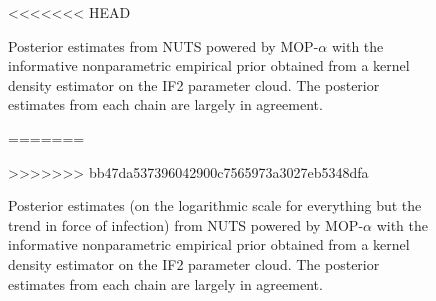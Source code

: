 \begin{figure}[H]
<<<<<<< HEAD
    \caption{Posterior estimates from NUTS powered by MOP-$\alpha$ with the informative nonparametric empirical prior obtained from a kernel density estimator on the IF2 parameter cloud. The posterior estimates from each chain are largely in agreement.}
=======
    \caption{Posterior estimates (on the logarithmic scale for everything but the trend in force of infection) from NUTS powered by MOP-$\alpha$ with the informative nonparametric empirical prior obtained from a kernel density estimator on the IF2 parameter cloud. The posterior estimates from each chain are largely in agreement.}
>>>>>>> bb47da537396042900c7565973a3027eb5348dfa
    \label{fig:posteriors}
\end{figure}

\FloatBarrier
\newpage